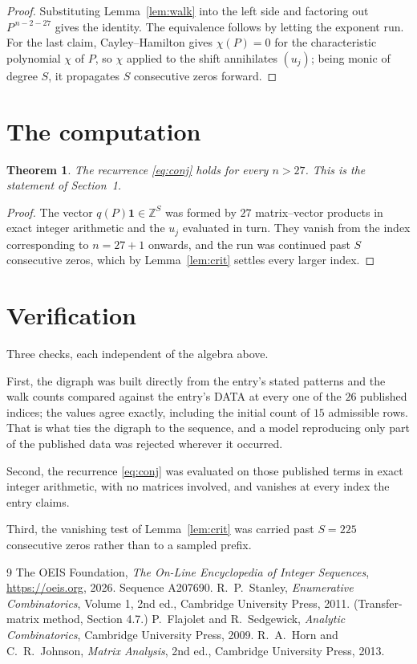 \documentclass[11pt,a4paper]{article}
\theoremstyle{plain}
\newtheorem{theorem}{Theorem}
\theoremstyle{definition}
\begin{document}
\begin{proof}
Substituting Lemma~\ref{lem:walk} into the left side and factoring out
$P^{\,n-2-27}$ gives the identity. The equivalence follows by letting the exponent
run. For the last claim, Cayley--Hamilton gives $\chi(P)=0$ for the characteristic
polynomial $\chi$ of $P$, so $\chi$ applied to the shift annihilates $(u_j)$; being monic of
degree $S$, it propagates $S$ consecutive zeros forward.
\end{proof}

\section{The computation}

\begin{theorem}
The recurrence \eqref{eq:conj} holds for every $n>27$. This is the statement of
Section~1.
\end{theorem}

\begin{proof}
The vector $q(P)\mathbf{1}\in\mathbb{Z}^{S}$ was formed by $27$ matrix--vector
products in exact integer arithmetic and the $u_j$ evaluated in turn. They vanish from the
index corresponding to $n=27+1$ onwards, and the run was continued past $S$ consecutive
zeros, which by Lemma~\ref{lem:crit} settles every larger index.
\end{proof}

\section{Verification}

Three checks, each independent of the algebra above.

First, the digraph was built directly from the entry's stated patterns and the walk counts
compared against the entry's DATA at every one of the $26$ published indices; the
values agree exactly, including the initial count of $15$ admissible rows. That is
what ties the digraph to the sequence, and a model reproducing only part of the published
data was rejected wherever it occurred.

Second, the recurrence \eqref{eq:conj} was evaluated on those published terms in exact
integer arithmetic, with no matrices involved, and vanishes at every index the entry claims.

Third, the vanishing test of Lemma~\ref{lem:crit} was carried past $S=225$ consecutive
zeros rather than to a sampled prefix.

\begin{thebibliography}{9}
 The OEIS Foundation, \emph{The On-Line Encyclopedia of Integer
Sequences}, \url{https://oeis.org}, 2026. Sequence A207690.
 R.~P.~Stanley, \emph{Enumerative Combinatorics}, Volume 1, 2nd ed.,
Cambridge University Press, 2011. (Transfer-matrix method, Section 4.7.)
 P.~Flajolet and R.~Sedgewick, \emph{Analytic Combinatorics}, Cambridge
University Press, 2009.
 R.~A.~Horn and C.~R.~Johnson, \emph{Matrix Analysis}, 2nd ed., Cambridge
University Press, 2013.
\end{thebibliography}
\end{document}

